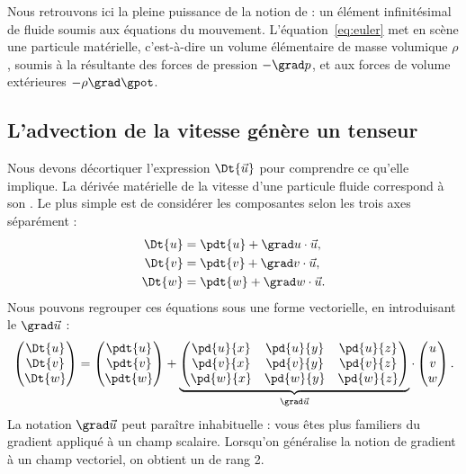Nous retrouvons ici la pleine puissance de la notion de  : un élément infinitésimal de fluide soumis aux équations du mouvement. L'équation~\eqref{eq:euler} met en scène une particule matérielle, c'est-à-dire un volume élémentaire de masse volumique $\rho$, soumis à la résultante des forces de pression $-\grad p$, et aux forces de volume extérieures $-\rho \grad \gpot$.

\subsection{L'advection de la vitesse génère un tenseur}
Nous devons décortiquer l'expression $\Dt{\vec{u}}$ pour comprendre ce qu'elle implique.
La dérivée matérielle de la vitesse d'une particule fluide correspond à son .
Le plus simple est de considérer les composantes selon les trois axes séparément :
\begin{displaymath}
  \begin{split}
    \Dt{u} &= \pdt{u} + \grad u \cdot \vec{u},\\
    \Dt{v} &= \pdt{v} + \grad v \cdot \vec{u},\\
    \Dt{w} &= \pdt{w} + \grad w \cdot \vec{u}.
  \end{split}
\end{displaymath}
Nous pouvons regrouper ces équations sous une forme vectorielle, en introduisant le  $\grad \vec{u}$ :
\begin{displaymath}
  \begin{pmatrix}
    \Dt{u} \\
    \Dt{v} \\
    \Dt{w}
  \end{pmatrix} =
  \begin{pmatrix}
    \pdt{u} \\
    \pdt{v} \\
    \pdt{w}
  \end{pmatrix} +
  \underbrace{
  \begin{pmatrix}
    \pd{u}{x} & \pd{u}{y} & \pd{u}{z} \\
    \pd{v}{x} & \pd{v}{y} & \pd{v}{z} \\
    \pd{w}{x} & \pd{w}{y} & \pd{w}{z}
  \end{pmatrix}}_{\grad \vec{u}}
  \cdot
  \begin{pmatrix}
    u \\
    v \\
    w
  \end{pmatrix}.
\end{displaymath}
La notation $\grad \vec{u}$ peut paraître inhabituelle : vous êtes plus familiers du gradient appliqué à un champ scalaire. Lorsqu’on généralise la notion de gradient à un champ vectoriel, on obtient un  de rang 2.

